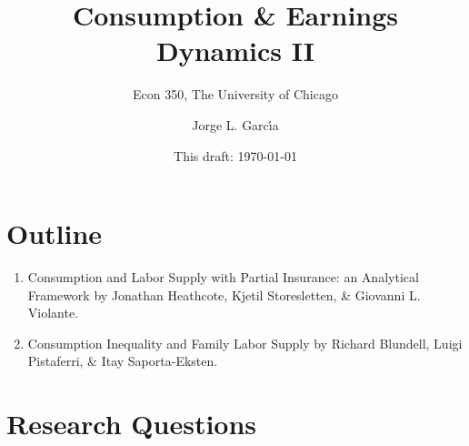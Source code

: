 \documentclass[notes=show]{beamer}
\begin{document}
\title[]{Consumption \& Earnings Dynamics II}
\subtitle{Econ 350, The University of Chicago}
\author[]{Jorge L. Garc\'{\i}a}
\institute{}
\date{This draft: \today}
\maketitle

\section{Outline}

\begin{frame}%


\begin{enumerate}
\item Consumption and Labor Supply with Partial Insurance: an Analytical
Framework by Jonathan Heathcote, Kjetil Storesletten, \& Giovanni L.
Violante.

\item Consumption Inequality and Family Labor Supply by Richard Blundell,
Luigi Pistaferri, \& Itay Saporta-Eksten.
\end{enumerate}

\transboxout%
\end{frame}%

\bigskip

\section{Research Questions}
\end{document}
